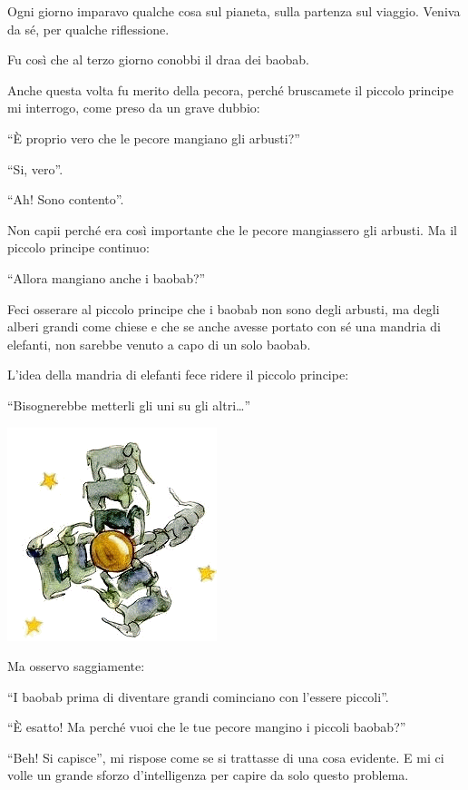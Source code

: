 \documentclass[11pt]{scrbook}
\begin{document}
Ogni giorno imparavo qualche cosa sul pianeta, sulla partenza sul
viaggio. Veniva da sé, per qualche riflessione.

Fu così che al terzo giorno conobbi il draa dei baobab.

Anche questa volta fu merito della pecora, perché bruscamete il piccolo
principe mi interrogo, come preso da un grave dubbio:

``È proprio vero che le pecore mangiano gli arbusti?''

``Si, vero''.

``Ah! Sono contento''.

Non capii perché era così importante che le pecore mangiassero gli
arbusti. Ma il piccolo principe continuo:

``Allora mangiano anche i baobab?''

Feci osserare al piccolo principe che i baobab non sono degli arbusti,
ma degli alberi grandi come chiese e che se anche avesse portato con sé
una mandria di elefanti, non sarebbe venuto a capo di un solo baobab.

L'idea della mandria di elefanti fece ridere il piccolo principe:

``Bisognerebbe metterli gli uni su gli altri\ldots{}''

\begin{center}
\includegraphics{img/5a}

\end{center}

Ma osservo saggiamente:

``I baobab prima di diventare grandi cominciano con l'essere piccoli''.

``È esatto! Ma perché vuoi che le tue pecore mangino i piccoli baobab?''

``Beh! Si capisce'', mi rispose come se si trattasse di una cosa
evidente. E mi ci volle un grande sforzo d'intelligenza per capire da
solo questo problema.
\end{document}
